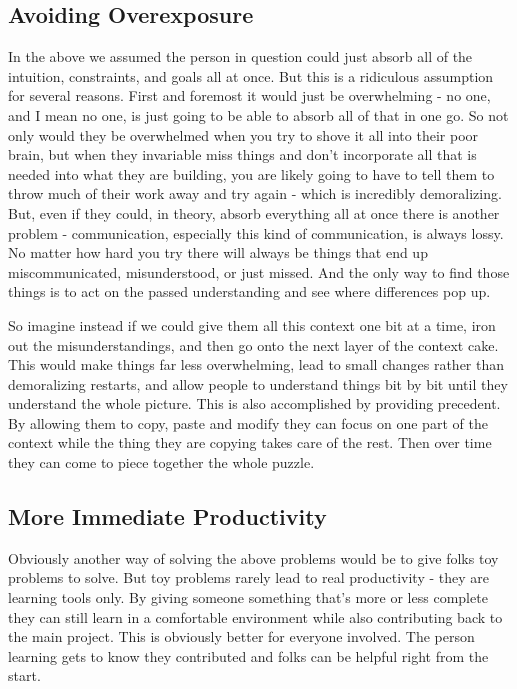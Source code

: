 \documentclass[10pt,a5paper]{book}
\begin{document}
\subsection{Avoiding Overexposure}
In the above we assumed the person in question could just absorb all of the intuition, constraints, and goals all at once. But this is a ridiculous assumption for several reasons. First and foremost it would just be overwhelming - no one, and I mean no one, is just going to be able to absorb all of that in one go. So not only would they be overwhelmed when you try to shove it all into their poor brain, but when they invariable miss things and don't incorporate all that is needed into what they are building, you are likely going to have to tell them to throw much of their work away and try again - which is incredibly demoralizing. But, even if they could, in theory, absorb everything all at once there is another problem - communication, especially this kind of communication, is always lossy. No matter how hard you try there will always be things that end up miscommunicated, misunderstood, or just missed. And the only way to find those things is to act on the passed understanding and see where differences pop up. 

So imagine instead if we could give them all this context one bit at a time, iron out the misunderstandings, and then go onto the next layer of the context cake. This would make things far less overwhelming, lead to small changes rather than demoralizing restarts, and allow people to understand things bit by bit until they understand the whole picture. This is also accomplished by providing precedent. By allowing them to copy, paste and modify they can focus on one part of the context while the thing they are copying takes care of the rest. Then over time they can come to piece together the whole puzzle. 

\subsection{More Immediate Productivity}
Obviously another way of solving the above problems would be to give folks toy problems to solve. But toy problems rarely lead to real productivity - they are learning tools only. By giving someone something that's more or less complete they can still learn in a comfortable environment while also contributing back to the main project. This is obviously better for everyone involved. The person learning gets to know they contributed and folks can be helpful right from the start. 
\end{document}
